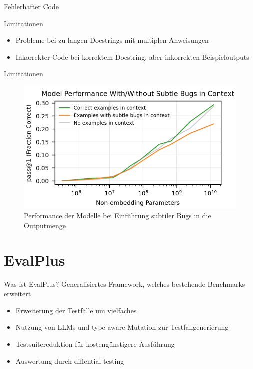 \documentclass{beamer}              %
\begin{document}
\begin{frame}{Fehlerhafter Code}
\begin{frame}{Limitationen}
\begin{itemize}
    \item Probleme bei zu langen Docstrings mit multiplen Anweisungen
    \item Inkorrekter Code bei korrektem Docstring, aber inkorrekten Beispieloutputs
\end{itemize}
\end{frame}

\begin{frame}{Limitationen}
    \begin{figure}
        \centering
        \includegraphics[width=0.6\paperwidth]{images/bugsinexamples.png}
        \caption{Performance der Modelle bei Einführung subtiler Bugs in die Outputmenge\cite{chen2021evaluating}}
    \end{figure}
\end{frame}

\section{EvalPlus}
\begin{frame}{Was ist EvalPlus?}
Generalisiertes Framework, welches bestehende Benchmarks erweitert\cite{liu2024your}
\begin{itemize}
    \item Erweiterung der Testfälle um vielfaches
    \item Nutzung von LLMs und type-aware Mutation zur Testfallgenerierung
    \item Testsuitereduktion für kostengünstigere Ausführung
    \item Auswertung durch diffential testing\cite{mckeeman1998differential}
\end{itemize}
\end{frame}


\end{frame}
\end{document}
